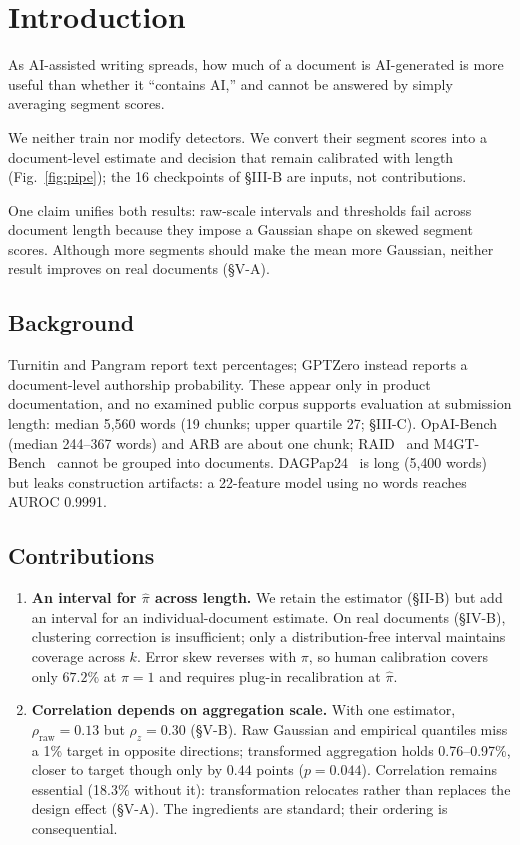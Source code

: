 \documentclass[10pt,conference,a4paper]{IEEEtran}
\newcommand{\sect}[1]{\S#1}
\begin{document}
\section{Introduction}

As AI-assisted writing spreads, how much of a document is AI-generated is more useful
than whether it ``contains AI,'' and cannot be answered by simply averaging segment
scores.

We neither train nor modify detectors. We convert their segment scores into a
document-level estimate and decision that remain calibrated with length
(Fig.~\ref{fig:pipe}); the 16 checkpoints of \sect{III-B} are inputs, not contributions.

One claim unifies both results: raw-scale intervals and thresholds fail across document
length because they impose a Gaussian shape on skewed segment scores. Although more
segments should make the mean more Gaussian, neither result improves on real documents
(\sect{V-A}).

\subsection{Background}
Turnitin and Pangram report text percentages; GPTZero instead reports a document-level
authorship probability. These appear only in product documentation, and no examined
public corpus supports evaluation at submission length: median 5{,}560 words
(19 chunks; upper quartile 27; \sect{III-C}). OpAI-Bench (median 244--367 words) and ARB
are about one chunk; RAID~\cite{raid2024} and M4GT-Bench~\cite{m4gt2024} cannot be
grouped into documents. DAGPap24~\cite{dagpap24} is long (5{,}400 words) but leaks
construction artifacts: a 22-feature model using no words reaches AUROC 0.9991.

\subsection{Contributions}
\begin{enumerate}
\item \textbf{An interval for $\hat{\pi}$ across length.} We retain the estimator
(\sect{II-B}) but add an interval for an individual-document estimate.
On real documents (\sect{IV-B}), clustering correction is insufficient; only a
distribution-free interval maintains coverage across $k$. Error skew reverses with
$\pi$, so human calibration covers only $67.2\%$ at $\pi{=}1$ and requires plug-in
recalibration at $\hat{\pi}$.

\item \textbf{Correlation depends on aggregation scale.} With one estimator,
$\rho_{\text{raw}}=0.13$ but $\rho_z=0.30$ (\sect{V-B}). Raw Gaussian and empirical
quantiles miss a 1\% target in opposite directions; transformed aggregation holds
0.76--0.97\%, closer to target though only by $0.44$ points ($p=0.044$). Correlation
remains
essential (18.3\% without it): transformation relocates rather than replaces the design
effect (\sect{V-A}). The ingredients are standard; their ordering is consequential.
\end{enumerate}
\end{document}

